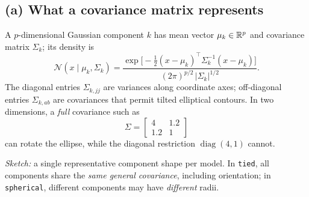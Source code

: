 \subsection*{(a) What a covariance matrix represents}
A $p$-dimensional Gaussian component $k$ has mean vector $\mu_k\in\mathbb R^p$ and covariance matrix $\Sigma_k$; its density is
\[
\mathcal N(x\mid\mu_k,\Sigma_k)=
\frac{\exp\big[-\tfrac12(x-\mu_k)^\top\Sigma_k^{-1}(x-\mu_k)\big]}
{(2\pi)^{p/2}\,|\Sigma_k|^{1/2}}.
\]
The diagonal entries $\Sigma_{k,jj}$ are variances along coordinate axes; off-diagonal entries $\Sigma_{k,ab}$ are covariances that permit tilted elliptical contours. In two dimensions, a \emph{full} covariance such as
\[
\Sigma=\begin{bmatrix}4&1.2\\1.2&1\end{bmatrix}
\]
can rotate the ellipse, while the diagonal restriction $\operatorname{diag}(4,1)$ cannot.
\begin{center}
\end{center}
\textit{Sketch:} a single representative component shape per model. In \texttt{tied}, all components share the \emph{same general covariance}, including orientation; in \texttt{spherical}, different components may have \emph{different} radii.

